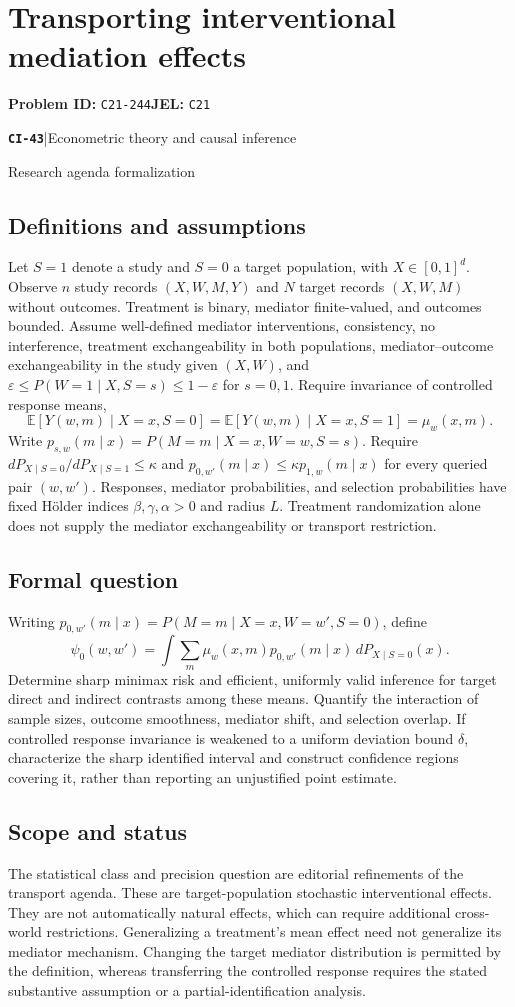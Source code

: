 \documentclass[11pt,a4paper]{article}
\newcommand{\E}{\mathbb E}
\newcommand{\entrymeta}[3]{{\sffamily\small\color{muted}\textbf{\texttt{#1}}\quad|\quad #2\par #3\par}}
\begin{document}
\section*{Transporting interventional mediation effects}
\textbf{Problem ID:} \texttt{C21-244}\quad \textbf{JEL:} \texttt{C21}\par
\label{problem:OP-0522}
\label{beyond:CI-43}
\entrymeta{CI-43}{Econometric theory and causal inference}{Research agenda formalization}
\subsection*{Definitions and assumptions}
Let $S=1$ denote a study and $S=0$ a target population, with $X\in[0,1]^d$. Observe $n$ study records $(X,W,M,Y)$ and $N$ target records $(X,W,M)$ without outcomes. Treatment is binary, mediator finite-valued, and outcomes bounded. Assume well-defined mediator interventions, consistency, no interference, treatment exchangeability in both populations, mediator--outcome exchangeability in the study given $(X,W)$, and $\varepsilon\leq P(W=1\mid X,S=s)\leq1-\varepsilon$ for $s=0,1$. Require invariance of controlled response means,
\[
 \E[Y(w,m)\mid X=x,S=0]=\E[Y(w,m)\mid X=x,S=1]=\mu_w(x,m).
\]
Write $p_{s,w}(m\mid x)=P(M=m\mid X=x,W=w,S=s)$. Require $dP_{X\mid S=0}/dP_{X\mid S=1}\leq\kappa$ and $p_{0,w'}(m\mid x)\leq\kappa p_{1,w}(m\mid x)$ for every queried pair $(w,w')$. Responses, mediator probabilities, and selection probabilities have fixed H\"older indices $\beta,\gamma,\alpha>0$ and radius $L$. Treatment randomization alone does not supply the mediator exchangeability or transport restriction.
\subsection*{Formal question}
Writing $p_{0,w'}(m\mid x)=P(M=m\mid X=x,W=w',S=0)$, define
\[
 \psi_0(w,w')=\int\sum_m\mu_w(x,m)p_{0,w'}(m\mid x)\,dP_{X\mid S=0}(x).
\]
Determine sharp minimax risk and efficient, uniformly valid inference for target direct and indirect contrasts among these means. Quantify the interaction of sample sizes, outcome smoothness, mediator shift, and selection overlap. If controlled response invariance is weakened to a uniform deviation bound $\delta$, characterize the sharp identified interval and construct confidence regions covering it, rather than reporting an unjustified point estimate.
\subsection*{Scope and status}
The statistical class and precision question are editorial refinements of the transport agenda. These are target-population stochastic interventional effects. They are not automatically natural effects, which can require additional cross-world restrictions. Generalizing a treatment's mean effect need not generalize its mediator mechanism. Changing the target mediator distribution is permitted by the definition, whereas transferring the controlled response requires the stated substantive assumption or a partial-identification analysis.
\end{document}
